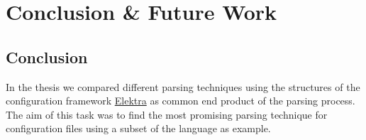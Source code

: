 \chapter{Conclusion \& Future Work}

%
%
%
%
%
%
%
%
%
%

\section{Conclusion}

In the thesis we compared different parsing techniques using the  structures of the configuration framework \href{https://www.libelektra.org}{Elektra} as common end product of the parsing process. The aim of this task was to find the most promising parsing technique for configuration files using a subset of the language  as example.

